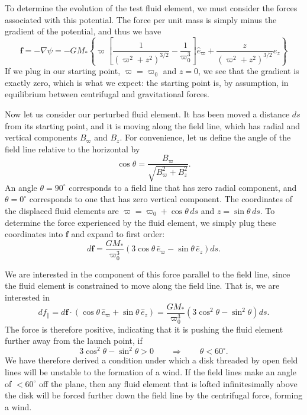 To determine the evolution of the test fluid element, we must consider the forces associated with this potential. The force per unit mass  is simply minus the gradient of the potential, and thus we have
\begin{equation}
\mathbf{f} = -\nabla \psi = -GM_* \left\{ \varpi \left[\frac{1}{(\varpi^2+z^2)^{3/2}} - \frac{1}{\varpi_0^3}\right]\hat{e}_\varpi + \frac{z}{(\varpi^2+z^2)^{3/2}} \hat{e}_z \right\}
\end{equation}
If we plug in our starting point, $\varpi = \varpi_0$ and $z=0$, we see that the gradient is exactly zero, which is what we expect: the starting point is, by assumption, in equilibrium between centrifugal and gravitational forces.

Now let us consider our perturbed fluid element. It has been moved a distance $ds$ from its starting point, and it is moving along the field line, which has radial and vertical components $B_\varpi$ and $B_z$. For convenience, let us define the angle of the field line relative to the horizontal by
\begin{equation}
\cos \theta = \frac{B_\varpi}{\sqrt{B_\varpi^2 + B_z^2}}.
\end{equation}
An angle $\theta=90^\circ$ corresponds to a field line that has zero radial component, and $\theta=0^\circ$ corresponds to one that has zero vertical component. The coordinates of the displaced fluid elements are $\varpi = \varpi_0 + \cos\theta \, ds$ and $z = \sin\theta \, ds$. To determine the force experienced by the fluid element, we simply plug these coordinates into $\mathbf{f}$ and expand to first order:
\begin{equation}
d\mathbf{f} = \frac{GM_*}{\varpi_0^3} \left(3 \cos\theta\,\hat{e}_\varpi - \sin\theta\,\hat{e}_z\right) ds.
\end{equation}

We are interested in the component of this force parallel to the field line, since the fluid element is constrained to move along the field line. That is, we are interested in
\begin{equation}
df_\parallel = d\mathbf{f} \cdot (\cos\theta\,\hat{e}_\varpi +  \sin \theta\,\hat{e}_z) = \frac{GM_*}{\varpi_0^3} \left(3\cos^2 \theta - \sin^2 \theta\right) ds.
\end{equation}
The force is therefore positive, indicating that it is pushing the fluid element further away from the launch point, if
\begin{equation}
3 \cos^2 \theta - \sin^2 \theta > 0
\qquad\Longrightarrow\qquad
\theta < 60^\circ.
\end{equation}
We have therefore derived a condition under which a disk threaded by open field lines will be unstable to the formation of a wind. If the field lines make an angle of $<60^\circ$ off the plane, then any fluid element that is lofted infinitesimally above the disk will be forced further down the field line by the centrifugal force, forming a wind.

